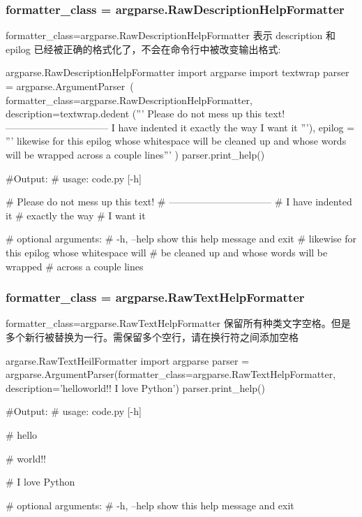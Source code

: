 \documentclass[11pt]{article}
\begin{document}
\subsubsection{formatter\_class = argparse.RawDescriptionHelpFormatter}
	formatter\_class=argparse.RawDescriptionHelpFormatter 表示 description 和 epilog 已经被正确的格式化了，不会在命令行中被改变输出格式:
 	\begin{Python}{argparse.RawDescriptionHelpFormatter}
import argparse
import textwrap
parser = argparse.ArgumentParser\
		(
		formatter_class=argparse.RawDescriptionHelpFormatter,
		description=textwrap.dedent
			('''
				Please do not mess up this text!
				--------------------------------
				I have indented it
				exactly the way
				I want it
			'''),
		epilog = '''
			likewise for this epilog whose whitespace will
			be cleaned up and whose words will be wrapped
			across a couple lines'''
		)
parser.print_help()
	
#Output:
#		usage: code.py [-h]

#		Please do not mess up this text!
#		--------------------------------
#		I have indented it
#		exactly the way
#		I want it

#		optional arguments:
#		-h, --help  show this help message and exit
#		likewise for this epilog whose whitespace will
#		be cleaned up and whose words will be wrapped
#		across a couple lines
	\end{Python}
\subsubsection{formatter\_class = argparse.RawTextHelpFormatter}
	formatter\_class=argparse.RawTextHelpFormatter 保留所有种类文字空格。但是多个新行被替换为一行。需保留多个空行，请在换行符之间添加空格
	\begin{Python}{argarse.RawTextHeilFormatter}
import argparse
parser = argparse.ArgumentParser(formatter_class=argparse.RawTextHelpFormatter,
description='hello\n \n \n world!! \n\n\n\n I love Python')
parser.print_help()
		
#Output:
#		usage: code.py [-h]

#		hello


#		world!!

#		I love Python

#		optional arguments:
#			-h, --help  show this help message and exit

	\end{Python}
	
\end{document}
